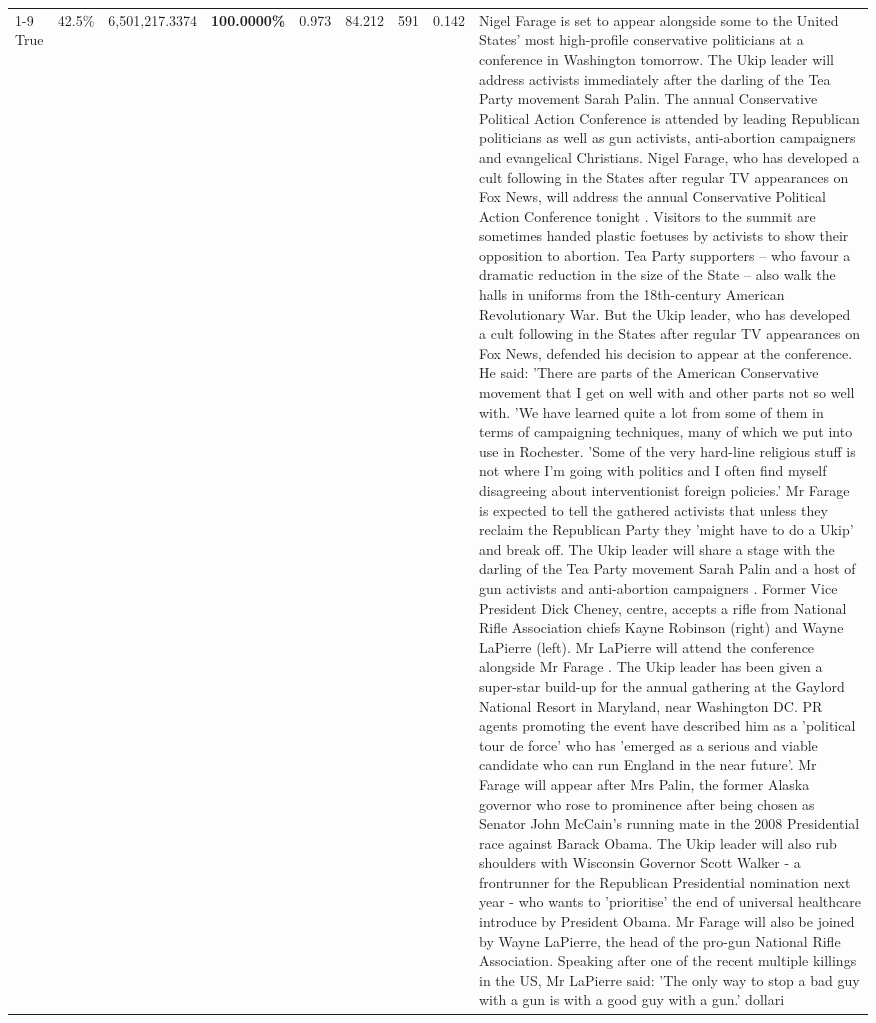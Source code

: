 \begin{table}[H]
\begin{tabular}{lllrlllll}
\cline{1-9} \cline{2-9}
True & 42.5\% & 6,501,217.3374 & \bfseries \color{red} 100.0000\% & 0.973 & 84.212 & 591 & 0.142 & Nigel Farage is set to appear alongside some to the United States' most high-profile conservative politicians at a conference in Washington tomorrow. The Ukip leader will address activists immediately after the darling of the Tea Party movement Sarah Palin. The annual Conservative Political Action Conference is attended by leading Republican politicians as well as gun activists, anti-abortion campaigners and evangelical Christians. Nigel Farage, who has developed a cult following in the States after regular TV appearances on Fox News, will address the annual Conservative Political Action Conference tonight . Visitors to the summit are sometimes handed plastic foetuses by activists to show their opposition to abortion. Tea Party supporters – who favour a dramatic reduction in the size of the State – also walk the halls in uniforms from the 18th-century American Revolutionary War. But the Ukip leader, who has developed a cult following in the States after regular TV appearances on Fox News, defended his decision to appear at the conference. He said: 'There are parts of the American Conservative movement that I get on well with and other parts not so well with. 'We have learned quite a lot from some of them in terms of campaigning techniques, many of which we put into use in Rochester. 'Some of the very hard-line religious stuff is not where I'm going with politics and I often find myself disagreeing about interventionist foreign policies.' Mr Farage is expected to tell the gathered activists that unless they reclaim the Republican Party they 'might have to do a Ukip' and break off. The Ukip leader will share a stage with the darling of the Tea Party movement Sarah Palin and a host of gun activists and anti-abortion campaigners . Former Vice President Dick Cheney, centre, accepts a rifle from National Rifle Association chiefs Kayne Robinson (right) and Wayne LaPierre (left). Mr LaPierre will attend the conference alongside Mr Farage . The Ukip leader has been given a super-star build-up for the annual gathering at the Gaylord National Resort in Maryland, near Washington DC. PR agents promoting the event have described him as a 'political tour de force' who has 'emerged as a serious and viable candidate who can run England in the near future'. Mr Farage will appear after Mrs Palin, the former Alaska governor who rose to prominence after being chosen as Senator John McCain's running mate in the 2008 Presidential race against Barack Obama. The Ukip leader will also rub shoulders with Wisconsin Governor Scott Walker - a frontrunner for the Republican Presidential nomination next year - who wants to 'prioritise' the end of universal healthcare introduce by President Obama. Mr Farage will also be joined by Wayne LaPierre, the head of the pro-gun National Rifle Association. Speaking after one of the recent multiple killings in the US, Mr LaPierre said: 'The only way to stop a bad guy with a gun is with a good guy with a gun.' dollari \\

\end{tabular}
\end{table}
